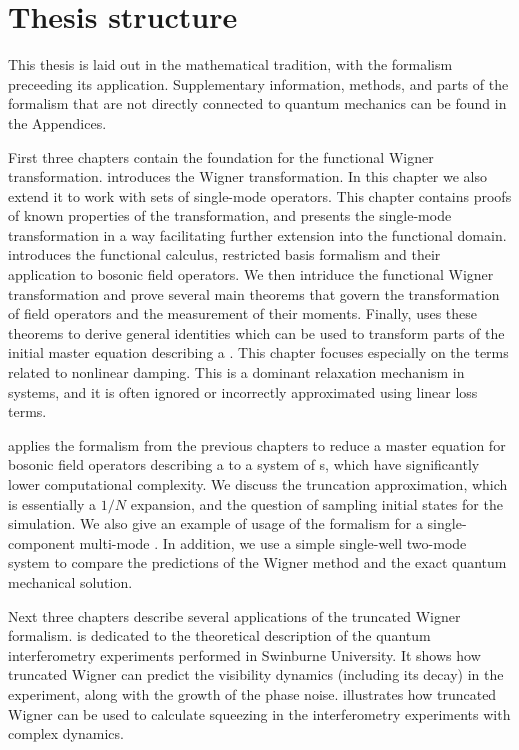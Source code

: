 \section{Thesis structure}

This thesis is laid out in the mathematical tradition, with the formalism preceeding its application.
Supplementary information, methods, and parts of the formalism that are not directly connected to quantum mechanics can be found in the Appendices.

First three chapters contain the foundation for the functional Wigner transformation.
 introduces the Wigner transformation.
In this chapter we also extend it to work with sets of single-mode operators.
This chapter contains proofs of known properties of the transformation, and presents the single-mode transformation in a way facilitating further extension into the functional domain.
 introduces the functional calculus, restricted basis formalism and their application to bosonic field operators.
We then intriduce the functional Wigner transformation and prove several main theorems that govern the transformation of field operators and the measurement of their moments.
Finally,  uses these theorems to derive general identities which can be used to transform parts of the initial master equation describing a .
This chapter focuses especially on the terms related to nonlinear damping.
This is a dominant relaxation mechanism in  systems, and it is often ignored or incorrectly approximated using linear loss terms.

 applies the formalism from the previous chapters to reduce a master equation for bosonic field operators describing a  to a system of s, which have significantly lower computational complexity.
We discuss the truncation approximation, which is essentially a $1/N$ expansion, and the question of sampling initial states for the simulation.
We also give an example of usage of the formalism for a single-component multi-mode .
In addition, we use a simple single-well two-mode system to compare the predictions of the Wigner method and the exact quantum mechanical solution.

Next three chapters describe several applications of the truncated Wigner formalism.
 is dedicated to the theoretical description of the quantum interferometry experiments performed in Swinburne University.
It shows how truncated Wigner can predict the visibility dynamics (including its decay) in the experiment, along with the growth of the phase noise.
 illustrates how truncated Wigner can be used to calculate squeezing in the interferometry experiments with complex dynamics.

